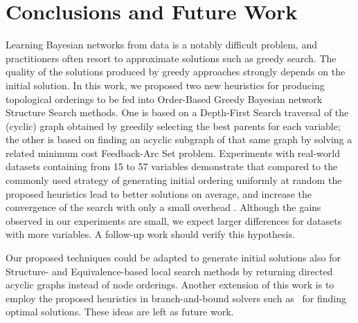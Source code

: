 \section{Conclusions and Future Work}
\label{sec:conclusions}

Learning Bayesian networks from data is a notably difficult problem, and practitioners often resort to approximate solutions such as greedy search. The quality of the solutions produced by greedy approaches strongly depends on the initial solution. In this work, we proposed two new heuristics for producing topological orderings to be fed into Order-Based Greedy Bayesian network Structure Search methods. One is based on a Depth-First Search traversal of the (cyclic) graph obtained by greedily selecting the best parents for each variable; the other is based on finding an acyclic subgraph of that same graph by solving a related minimum cost Feedback-Arc Set problem. Experiments with real-world datasets containing from 15 to 57 variables demonstrate that compared to the commonly used strategy of generating initial ordering uniformly at random the proposed heuristics lead to better solutions on average, and increase the  convergence of the search with only a small overhead . Although the gains observed in our experiments are small, we expect larger differences for datasets with more variables. A follow-up work should verify this hypothesis.

Our proposed techniques could be adapted to generate initial solutions
also for Structure- and Equivalence-based local search methods by returning  directed acyclic graphs instead of node orderings. Another extension of this work is to employ the proposed heuristics in branch-and-bound solvers such as~\cite{Cassio11} for finding optimal solutions. These ideas are left as future work.

